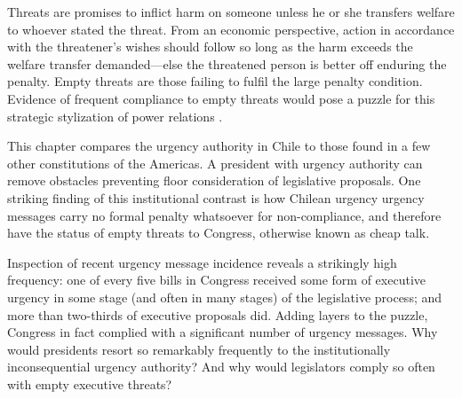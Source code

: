 \documentclass[letter,12pt]{article}
\begin{document}

\onehalfspacing

\noindent Threats are promises to inflict harm on someone unless he or she transfers welfare to whoever stated the threat. From an economic perspective, action in accordance with the threatener's wishes should follow so long as the harm exceeds the welfare transfer demanded---else the threatened person is better off enduring the penalty. Empty threats are those failing to fulfil the large penalty condition. Evidence of frequent compliance to empty threats would pose a puzzle for this strategic stylization of power relations \citep{dahl.ConceptPower1957,friedrich.1941,schelling.1960}. 

This chapter compares the urgency authority in Chile to those found in a few other constitutions of the Americas. A president with urgency authority can remove obstacles preventing floor consideration of legislative proposals. One striking finding of this institutional contrast is how Chilean urgency urgency messages carry no formal penalty whatsoever for non-compliance, and therefore have the status of empty threats to Congress, otherwise known as cheap talk. 

Inspection of recent urgency message incidence reveals a strikingly high frequency: one of every five bills in Congress received some form of executive urgency in some stage (and often in many stages) of the legislative process; and more than two-thirds of executive proposals did. Adding layers to the puzzle, Congress in fact complied with a significant number of urgency messages. Why would presidents resort so remarkably frequently to the institutionally inconsequential urgency authority? And why would legislators comply so often with empty executive threats?
\end{document}
